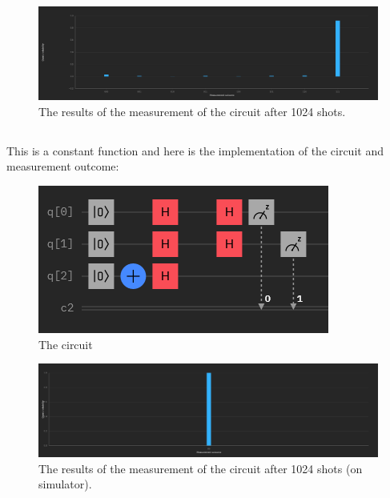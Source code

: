 \documentclass[12pt]{article}
\begin{document}
\begin{figure}[H]
    \centering
    \includegraphics[scale=0.27]{2ar.png}
    \caption{The results of the measurement of the circuit after 1024 shots.}
\end{figure}

\newpage 

\subsection*{}

This is a constant function and here is the implementation of the circuit and measurement outcome:

\begin{figure}[H]
    \centering
    \includegraphics[scale=0.9]{2b.png}
    \caption{The circuit}
\end{figure}

\begin{figure}[H]
    \centering
    \includegraphics[scale=0.27]{2br.png}
    \caption{The results of the measurement of the circuit after 1024 shots (on simulator).}
\end{figure}

\newpage
\end{document}
